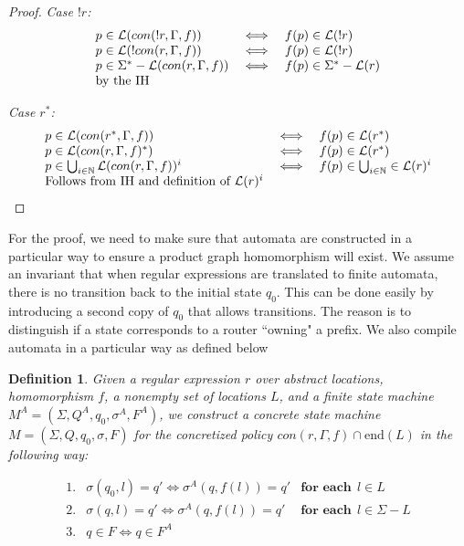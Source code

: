 \documentclass[twocolumn, openany]{sig-alternate-10pt}
\newcommand{\EndR}{\ensuremath{\mathrm{end}}}
\newtheorem{defn}{Definition}
\begin{document}
\begin{proof}
\emph{Case $!r$:}
  \[ \begin{array}{lll}
    p \in \mathcal{L}(con(!r,\Gamma,f)) &\iff& f(p) \in \mathcal{L}(!r) \\
    p \in \mathcal{L}(!con(r,\Gamma,f)) &\iff& f(p) \in \mathcal{L}(!r) \\
    p \in \Sigma^* - \mathcal{L}(con(r,\Gamma,f)) &\iff& f(p) \in \Sigma^* - \mathcal{L}(r) \\
    \text{by the IH} & & \\
  \end{array} \]

\emph{Case $r^*$:}
  \[ \begin{array}{lll}
    p \in \mathcal{L}(con(r^*,\Gamma,f)) &\iff& f(p) \in \mathcal{L}(r^*) \\
    p \in \mathcal{L}(con(r,\Gamma,f)^*) &\iff& f(p) \in \mathcal{L}(r^*) \\
    p \in \bigcup_{i \in \mathbb{N}} \mathcal{L}(con(r,\Gamma,f))^i &\iff& f(p) \in \bigcup_{i \in \mathbb{N}} \in \mathcal{L}(r)^i \\
    \text{Follows from IH and definition of } \mathcal{L}(r)^i & & \\
  \end{array} \]

\end{proof}



\vspace{1em}
For the proof, we need to make sure that automata are constructed in a particular way to ensure a product graph homomorphism will exist. We assume an invariant that when regular expressions are translated to finite automata, there is no transition back to the initial state $q_0$. This can be done easily by introducing a second copy of $q_0$ that allows transitions. The reason is to distinguish if a state corresponds to a router ``owning" a prefix. We also compile automata in a particular way as defined below

\begin{defn}
Given a regular expression $r$ over abstract locations, homomorphism $f$, a nonempty set of locations $L$, and a finite state machine $M^A = (\Sigma,Q^A,q_0,\sigma^A,F^A)$, we construct a concrete state machine $M = (\Sigma, Q, q_0, \sigma, F)$ for the concretized policy $con(r,\Gamma, f) \cap \EndR(L)$ in the following way: 

    \[ \begin{array}{lll}
      1. & \sigma(q_0,l) = q' \iff \sigma^A(q,f(l)) = q' & \textbf{for each}~~ l \in L \\
      2. & \sigma(q,l) = q' \iff \sigma^A(q,f(l)) = q' & \textbf{for each}~~ l \in \Sigma - L \\
      3. & q \in F \iff q \in F^A & \\
    \end{array} \]
\end{defn}
\end{document}
